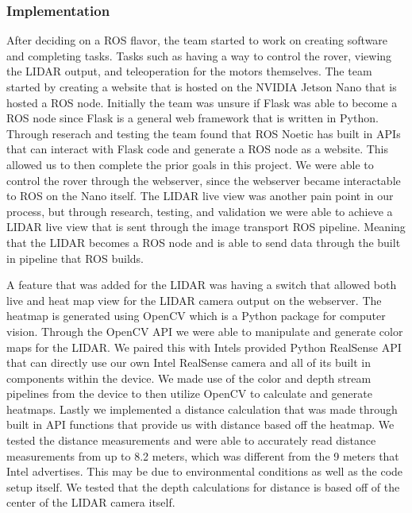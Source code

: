 \documentclass[a4paper, 10pt]{article}
\begin{document}
    \subsubsection*{Implementation}
    After deciding on a ROS flavor, the team started to work on creating software and completing tasks. Tasks such as having a way to control the rover, viewing the LIDAR output, and teleoperation for the motors themselves. The team started by creating a website that is hosted on the NVIDIA Jetson Nano that is hosted a ROS node. Initially the team was unsure if Flask was able to become a ROS node since Flask is a general web framework that is written in Python. Through reserach and testing the team found that ROS Noetic has built in APIs that can interact with Flask code and generate a ROS node as a website. This allowed us to then complete the prior goals in this project. We were able to control the rover through the webserver, since the webserver became interactable to ROS on the Nano itself. The LIDAR live view was another pain point in our process, but through research, testing, and validation we were able to achieve a LIDAR live view that is sent through the image transport ROS pipeline. Meaning that the LIDAR becomes a ROS node and is able to send data through the built in pipeline that ROS builds. 

    A feature that was added for the LIDAR was having a switch that allowed both live and heat map view for the LIDAR camera output on the webserver. The heatmap is generated using OpenCV which is a Python package for computer vision. Through the OpenCV API we were able to manipulate and generate color maps for the LIDAR. We paired this with Intels provided Python RealSense API that can directly use our own Intel RealSense camera and all of its built in components within the device. We made use of the color and depth stream pipelines from the device to then utilize OpenCV to calculate and generate heatmaps. 
    Lastly we implemented a distance calculation that was made through built in API functions that provide us with distance based off the heatmap. 
    We tested the distance measurements and were able to accurately read distance measurements from up to 8.2 meters, which was different from the 9 meters that Intel advertises. This may be due to environmental conditions as well as the code setup itself. We tested that the depth calculations for distance is based off of the center of the LIDAR camera itself.
\end{document}
